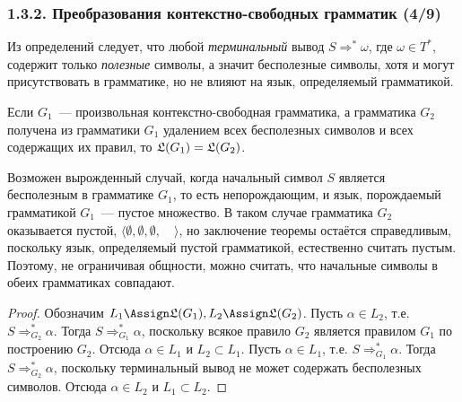\begin{frame}
\frametitle{1.3.2. Преобразования контекстно-свободных грамматик (4/9)}

Из определений следует, что  любой {\em терминальный} 
вывод $S \Rightarrow^* \omega$, где $\omega\in T^*$, 
содержит только {\em полезные} символы, а значит бесполезные символы, хотя и могут присутствовать в
грамматике, но не влияют на язык, определяемый грамматикой. 

\begin{theorem}
Если $G_1$~--- произвольная контекстно-свободная 
грамматика, а грамматика $G_2$ получена из грамматики
$G_1$ удалением всех бесполезных символов и всех содержащих их правил, то $\frak{L}(G_1)=\frak{L}(G_2)$. 
\end{theorem}

\begin{remark}
Возможен вырожденный случай, когда начальный 
символ $S$ является бесполезным
в грамматике $G_1$, то есть непорождающим,
и язык, порождаемый грамматикой $G_1$~--- пустое множество. В таком случае 
грамматика $G_2$ оказывается пустой, $\langle\emptyset,
\emptyset, \emptyset, \quad\rangle$,
но заключение теоремы остаётся справедливым,
поскольку язык, определяемый пустой 
грамматикой, естественно считать пустым.
Поэтому, не ограничивая общности,
можно считать, что начальные символы
в обеих грамматиках совпадают.  
\end{remark}

\begin{proof}
Обозначим $L_1\Assign\frak{L}(G_1), L_2\Assign\frak{L}(G_2)$. 
Пусть $\alpha\in L_2$, т.е. $S\Rightarrow^*_{G_2} \alpha$.
Тогда $S\Rightarrow^*_{G_1} \alpha$, поскольку всякое
правило $G_2$ является правилом $G_1$ по построению $G_2$.
Отсюда $\alpha\in L_1$ и $L_2\subset L_1$.
Пусть $\alpha\in L_1$, т.е. $S\Rightarrow^*_{G_1} \alpha$.
Тогда $S\Rightarrow^*_{G_2} \alpha$, поскольку терминальный вывод не может содержать бесполезных символов.
Отсюда $\alpha\in L_2$ и $L_1\subset L_2$.
\end{proof}

\end{frame}



